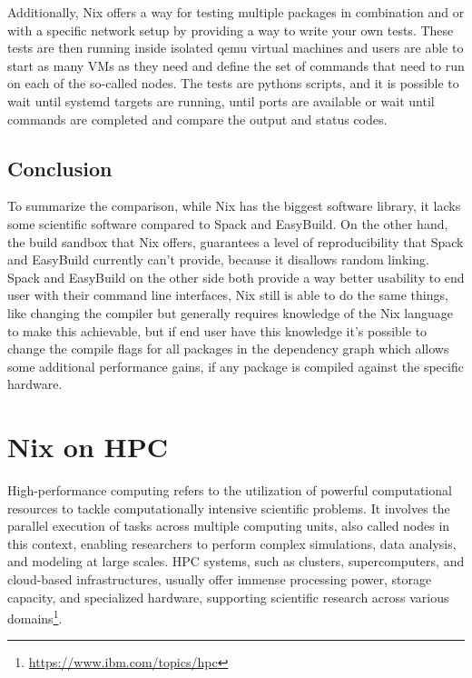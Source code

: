 \documentclass{eceasst}
\begin{document}
Additionally, Nix offers a way for testing multiple packages in combination and or with a specific network setup by providing a way to write your own tests.
These tests are then running inside isolated qemu virtual machines and users are able to start as many VMs as they need and define the set of commands that need to run on each of the so-called nodes.
The tests are pythons scripts, and it is possible to wait until systemd targets are running, until ports are available or wait until commands are completed and compare the output and status codes.

\subsection{Conclusion}

To summarize the comparison, while Nix has the biggest software library, it lacks some scientific software compared to Spack and EasyBuild.
On the other hand, the build sandbox that Nix offers, guarantees a level of reproducibility that Spack and EasyBuild currently can't provide, because it disallows random linking.
Spack and EasyBuild on the other side both provide a way better usability to end user with their command line interfaces, Nix still is able to do the same things, like changing the compiler but generally requires knowledge of the Nix language to make this achievable, but if end user have this knowledge it's possible to change the compile flags for all packages in the dependency graph which allows some additional performance gains, if any package is compiled against the specific hardware.

\section{Nix on HPC}\label{sec:nix-on-hpc}

High-performance computing refers to the utilization of powerful computational resources to tackle computationally intensive scientific problems.
It involves the parallel execution of tasks across multiple computing units, also called nodes in this context, enabling researchers to perform complex simulations, data analysis, and modeling at large scales.
HPC systems, such as clusters, supercomputers, and cloud-based infrastructures, usually offer immense processing power, storage capacity, and specialized hardware, supporting scientific research across various domains\footnote{\url{https://www.ibm.com/topics/hpc}}.
\end{document}

